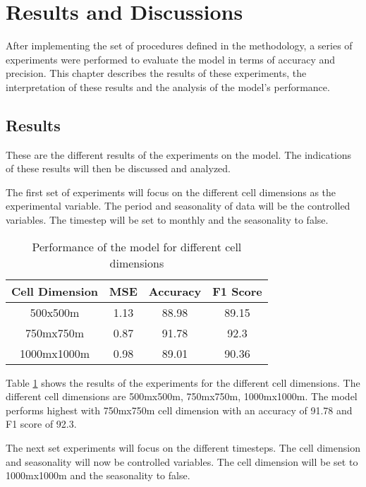 \section{Results and Discussions}
    After implementing the set of procedures defined in the methodology, a series of experiments were performed to evaluate the model in terms of accuracy and precision. This chapter describes the results of these experiments, the interpretation of these results and the analysis of the model's performance.
\subsection{Results}
    These are the different results of the experiments on the model. The indications of these results will then be discussed and analyzed.

    The first set of experiments will focus on the different cell dimensions as the experimental variable. The period and seasonality of data will be the controlled variables. The timestep will be set to monthly and the seasonality to false.

    \begin{table}[H]
      \centering
      \begin{tabular}{|c|c|c|c|}
            \hline
          \textbf{Cell Dimension}  &\textbf{MSE}  &\textbf{Accuracy} &\textbf{F1 Score}\\ 
          \hline
          500x500m &1.13 &88.98 &89.15 \\
          750mx750m &0.87 &91.78 &92.3 \\
          1000mx1000m  &0.98 &89.01 &90.36 \\
          \hline
        \end{tabular}
      \caption{Performance of the model for different cell dimensions}
      \label{table:dimension-results}
    \end{table}
    Table \ref{table:dimension-results} shows the results of the experiments for the different cell dimensions. The different cell dimensions are 500mx500m, 750mx750m, 1000mx1000m. The model performs highest with 750mx750m cell dimension with an accuracy of 91.78 and F1 score of 92.3.

    The next set experiments will focus on the different timesteps. The cell dimension and seasonality will now be controlled variables. The cell dimension will be set to 1000mx1000m and the seasonality to false.

